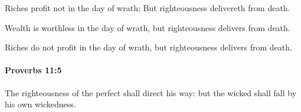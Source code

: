 			\begin{versebox}
					\item[BHS] 
					\item[ASV] Riches profit not in the day of wrath; But righteousness delivereth from death.
					\item[NIV] Wealth is worthless in the day of wrath, but righteousness delivers from death.
					\item[NRSV] Riches do not profit in the day of wrath, but righteousness delivers from death.
			\end{versebox}

		\paragraph{Proverbs 11:5} %
			\label{PROVERBS-11-5}

			The righteousness of the perfect shall direct his way: but the wicked shall fall by his own wickedness.

